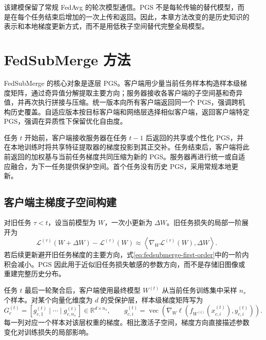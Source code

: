 该建模保留了常规 FedAvg 的轮次模型通信。PGS 不是每轮传输的替代模型，而是在每个任务结束后增加的一次上传和返回。因此，本章方法改变的是历史知识的表示和本地梯度更新方式，而不是用低秩子空间替代完整全局模型。

\section{FedSubMerge 方法}
\label{sec:fedsubmerge-method}

\label{subsec:fedsubmerge-overview}

FedSubMerge 的核心对象是逐层 PGS。客户端用少量当前任务样本构造样本级梯度矩阵，通过奇异值分解提取主要方向；服务器接收各客户端的子空间基和奇异值，并再次执行拼接与压缩。统一版本向所有客户端返回同一个 PGS，强调跨机构历史覆盖。自适应版本按目标客户端和网络层选择相似客户端，返回客户端特定 PGS，强调在异质性下保留优化自由度。

任务 $t$ 开始前，客户端接收服务器在任务 $t-1$ 后返回的共享或个性化 PGS，并在本地训练时将共享特征提取器的梯度投影到其正交补。任务结束后，客户端将此前返回的加权基与当前任务梯度共同压缩为新的 PGS。服务器再进行统一或自适应融合，为下一任务提供保护空间。首个任务没有历史 PGS，采用常规本地更新。

\subsection{客户端主梯度子空间构建}
\label{subsec:fedsubmerge-client-pgs}

对旧任务 $\tau<t$，设当前模型为 $W$，一次小更新为 $\Delta W$。旧任务损失的局部一阶展开为
\begin{equation}
\mathcal{L}^{(\tau)}(W+\Delta W)
-
\mathcal{L}^{(\tau)}(W)
\approx
\left\langle
\nabla_W\mathcal{L}^{(\tau)}(W),\Delta W
\right\rangle.
\label{eq:fedsubmerge-first-order}
\end{equation}
若后续更新避开旧任务梯度的主要方向，式\eqref{eq:fedsubmerge-first-order}中的一阶内积会减小。PGS 因此用于近似旧任务损失敏感的参数方向，而不是存储旧图像或重建完整历史分布。

任务 $t$ 最后一轮聚合后，客户端使用最终模型 $W^{(t)}$ 从当前任务训练集中采样 $n_s$ 个样本。对某个向量化维度为 $d$ 的受保护层，样本级梯度矩阵写为
\begin{equation}
G_c^{(t)}
=
\left[
 g_{c,1}^{(t)}\mid\cdots\mid g_{c,n_s}^{(t)}
\right]
\in\mathbb{R}^{d\times n_s},
\qquad
 g_{c,i}^{(t)}
=
\operatorname{vec}\!\left(
\nabla_W\ell\!\left(f_{W^{(t)}}(x_{c,i}^{(t)}),y_{c,i}^{(t)}\right)
\right).
\label{eq:fedsubmerge-gradient-matrix}
\end{equation}
每一列对应一个样本对该层权重的梯度。相比激活子空间，梯度方向直接描述参数变化对训练损失的局部影响。

